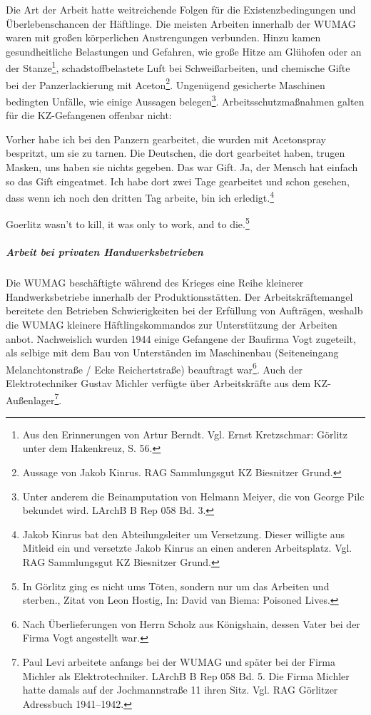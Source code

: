 \documentclass[a4paper,12pt,ngerman,
]{nisebook}
\begin{document}
Die Art der Arbeit hatte weitreichende Folgen für die Existenzbedingungen und Überlebenschancen der Häftlinge. Die meisten Arbeiten innerhalb der WUMAG waren mit großen körperlichen Anstrengungen verbunden. Hinzu kamen gesundheitliche Belastungen und Gefahren, wie große Hitze am Glühofen oder an der Stanze\footnote{Aus den Erinnerungen von Artur Berndt. Vgl. Ernst Kretzschmar: Görlitz unter dem Hakenkreuz, S. 56.}, schadstoffbelastete Luft bei Schweißarbeiten, und chemische Gifte bei der Panzerlackierung mit Aceton\footnote{Aussage von Jakob Kinrus. RAG Sammlungsgut KZ Biesnitzer Grund.}. Ungenügend gesicherte Maschinen bedingten Unfälle, wie einige Aussagen belegen\footnote{Unter anderem die Beinamputation von Helmann Meiyer, die von George Pilc bekundet wird. LArchB B Rep 058 Bd. 3.}. Arbeitsschutzmaßnahmen galten für die KZ-Gefangenen offenbar nicht:

\begin{leftbar}
Vorher habe ich bei den Panzern gearbeitet, die wurden mit Acetonspray bespritzt, um sie zu tarnen. Die Deutschen, die dort gearbeitet haben, trugen Masken, uns haben sie nichts gegeben. Das war Gift. Ja, der Mensch hat einfach so das Gift eingeatmet. Ich habe dort zwei Tage gearbeitet und schon gesehen, dass wenn ich noch den dritten Tag arbeite, bin ich erledigt.\footnote{Jakob Kinrus bat den Abteilungsleiter um Versetzung. Dieser willigte aus Mitleid ein und versetzte Jakob Kinrus an einen anderen Arbeitsplatz. Vgl. RAG Sammlungsgut KZ Biesnitzer Grund.}
\end{leftbar}

\begin{leftbar}
Goerlitz wasn't to kill, it was only to work, and to die.\footnote{\glqq In Görlitz ging es nicht ums Töten, sondern nur um das Arbeiten und sterben.\grqq, Zitat von Leon Hostig, In: David van Biema: \glqq Poisoned Lives\grqq.}
\end{leftbar}

\subparagraph{Arbeit bei privaten Handwerksbetrieben}
Die WUMAG beschäftigte\label{michel} während des Krieges eine Reihe kleinerer Handwerksbetriebe innerhalb der Produktionsstätten. Der Arbeitskräftemangel bereitete den Betrieben Schwierigkeiten bei der Erfüllung von Aufträgen, weshalb die WUMAG kleinere Häftlingskommandos zur Unterstützung der Arbeiten anbot. Nachweislich wurden 1944 einige Gefangene der Baufirma Vogt zugeteilt, als selbige mit dem Bau von Unterständen im Maschinenbau (Seiteneingang Melanchtonstraße / Ecke Reichertstraße) beauftragt war\footnote{Nach Überlieferungen von Herrn Scholz aus Königshain, dessen Vater bei der Firma Vogt angestellt war.}. Auch der Elektrotechniker Gustav Michler verfügte über Arbeitskräfte aus dem KZ-Außenlager\footnote{Paul Levi arbeitete anfangs bei der WUMAG und später bei der Firma Michler als Elektrotechniker. LArchB B Rep 058 Bd. 5. Die Firma Michler hatte damals auf der Jochmannstraße 11 ihren Sitz. Vgl. RAG Görlitzer Adressbuch 1941--1942.}.
\end{document}
